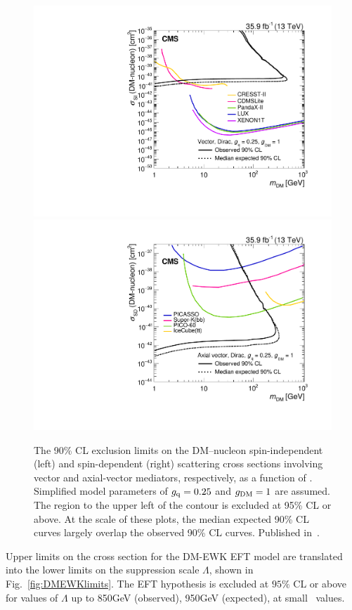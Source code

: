 \begin{figure}[htbp]
  \begin{center}
    \includegraphics[width=0.48\linewidth]{figures/exo16053/Figure_008-a.pdf}
    \includegraphics[width=0.48\linewidth]{figures/exo16053/Figure_008-b.pdf}
    \caption{
      The 90\% CL exclusion limits on the DM--nucleon spin-independent (left)
      and spin-dependent (right) scattering cross sections involving vector and axial-vector mediators, respectively,
      as a function of \mdm. Simplified model parameters of $g_\mathrm{q}=0.25$ and $g_\mathrm{DM}=1$ are assumed.
      The region to the upper left of the contour is excluded at 95\% CL or above. At the scale of these plots, the median
      expected 90\% CL curves largely overlap the observed 90\% CL curves.
      Published in~\cite{ref:JHEP02(2019)074}.
    }
    \label{fig:2d_mx}
  \end{center}
\end{figure}

Upper limits on the cross section for the DM-EWK EFT model are translated into the lower limits on the suppression scale $\Lambda$, shown in
Fig.~\ref{fig:DMEWKlimits}. The EFT hypothesis is excluded at $95\%$ CL or above for values of $\Lambda$ up to 850\unit{GeV} (observed), 950\unit{GeV}
(expected), at small \mdm\ values.


